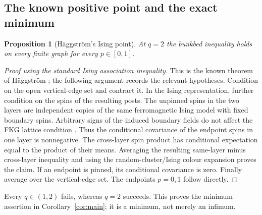 \documentclass[11pt,a4paper]{article}
\newtheorem{proposition}[theorem]{Proposition}
\theoremstyle{remark}\newtheorem{remark}[theorem]{Remark}
\begin{document}
\subsection{The known positive point and the exact minimum}
\begin{proposition}[H\"aggstr\"om's Ising point]\label{prop:ising}
At $q=2$ the bunkbed inequality holds on every finite graph for every $p\in[0,1]$.
\end{proposition}
\begin{proof}[Proof using the standard Ising association inequality]
This is the known theorem of H\"aggstr\"om \cite{Haggstrom}; the following argument records the relevant hypotheses. Condition on the open vertical-edge set and contract it. In the Ising representation, further condition on the spins of the resulting posts. The unpinned spins in the two layers are independent copies of the same ferromagnetic Ising model with fixed boundary spins. Arbitrary signs of the induced boundary fields do not affect the FKG lattice condition \cite{FKG}. Thus the conditional covariance of the endpoint spins in one layer is nonnegative. The cross-layer spin product has conditional expectation equal to the product of their means. Averaging the resulting same-layer minus cross-layer inequality and using the random-cluster/Ising colour expansion proves the claim. If an endpoint is pinned, its conditional covariance is zero. Finally average over the vertical-edge set. The endpoints $p=0,1$ follow directly.
\end{proof}
Every $q\in(1,2)$ fails, whereas $q=2$ succeeds. This proves the minimum assertion in Corollary~\ref{cor:main}; it is a minimum, not merely an infimum.
\end{document}

